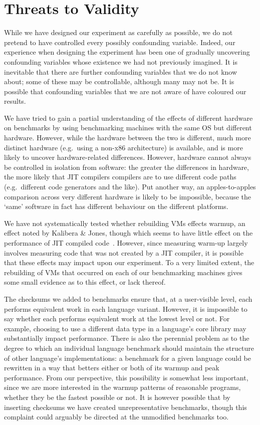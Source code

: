 \documentclass[preprint,numbers,10pt]{sigplanconf}
\newcommand{\kalibera}{Kalibera \& Jones\xspace}
\begin{document}
\section{Threats to Validity}
\label{sec:threats}

While we have designed our experiment as carefully as possible, we do not
pretend to have controlled every possibly confounding variable. Indeed, our
experience when designing the experiment has been one of gradually uncovering
confounding variables whose existence we had not previously imagined. It
is inevitable that there are further confounding variables that we
do not know about; some of these may be controllable, although many may not be.
It is possible that confounding variables that we are not aware of have
coloured our results.

We have tried to gain a partial understanding of the effects of different
hardware on benchmarks by using benchmarking machines with the same OS but
different hardware. However, while the hardware between the two is
different, much more distinct hardware (e.g.~using a non-x86 architecture) is
available, and is more likely to uncover hardware-related differences.
However, hardware cannot always be controlled in isolation from software:
the greater the differences in hardware, the more likely that JIT compilers
compilers are to use different code paths (e.g.~different code generators and
the like). Put another way, an apples-to-apples comparison across very different
hardware is likely to be impossible, because the `same' software in fact has
different behaviour on the different platforms.

We have not systematically tested whether rebuilding VMs effects warmup, an
effect noted by \kalibera, though which seems to have little effect on
the performance of JIT compiled code~\cite{barrett15approaches}. However, since measuring warm-up largely
involves measuring code that was not created by a JIT compiler, it is possible
that these effects may impact upon our experiment. To a very limited extent, the
rebuilding of VMs that occurred on each of our benchmarking machines gives
some small evidence as to this effect, or lack thereof.

The checksums we added to benchmarks ensure that, at a user-visible level, each
performs equivalent work in each language variant. However, it is impossible to
say whether each performs equivalent work at the lowest level or not. For
example, choosing to use a different data type in a language's core library may
substantially impact performance. There is also the perennial problem as to the
degree to which an individual language benchmark should maintain the structure
of other language's implementations: a benchmark for a given language could be
rewritten in a way that betters either or both of its warmup and peak
performance. From our perspective, this possibility is somewhat less important,
since we are more interested in the warmup patterns of reasonable programs,
whether they be the fastest possible or not. It is however possible that by
inserting checksums we have created unrepresentative benchmarks, though
this complaint could arguably be directed at the unmodified benchmarks too.
\end{document}
